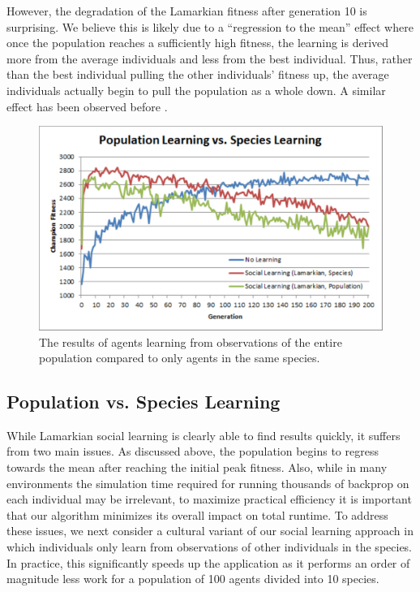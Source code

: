 \documentclass{acm_proc_article-sp}
\begin{document}
However, the degradation of the Lamarkian fitness after generation 10 is surprising. We believe this is likely due to a ``regression to the mean'' effect where once the population reaches a sufficiently high fitness, the learning is derived more from the average individuals and less from the best individual. Thus, rather than the best individual pulling the other individuals' fitness up, the average individuals actually begin to pull the population as a whole down. A similar effect has been observed before \cite{denaro1996cultural}.

\begin{figure}
  \centering
    \includegraphics[scale=.35]{population_species.pdf}
  \caption{The results of agents learning from observations of the entire population compared to only agents in the same species.}
  \label{fig:population-species}
\end{figure}

\subsection*{Population vs. Species Learning}
While Lamarkian social learning is clearly able to find results quickly, it suffers from two main issues. As discussed above, the population begins to regress towards the mean after reaching the initial peak fitness. Also, while in many environments the simulation time required for running thousands of backprop on each individual may be irrelevant, to maximize practical efficiency it is important that our algorithm minimizes its overall impact on total runtime. To address these issues, we next consider a cultural variant of our social learning approach in which individuals only learn from observations of other individuals in the species. In practice, this significantly speeds up the application as it performs an order of magnitude less work for a population of 100 agents divided into 10 species.
\end{document}
